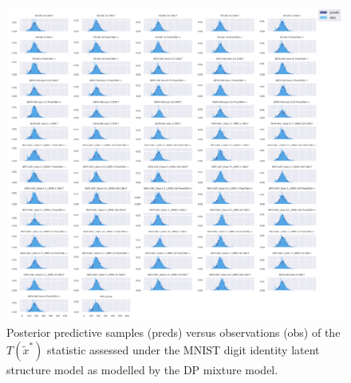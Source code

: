 \begin{figure}[!htb]
    \centering
    \includegraphics[width=\textwidth]{images/bda_checks/surprisal_dps/mnist_prediction_checks__unconditional_conditional.png}
    \caption{Posterior predictive samples (preds) versus observations (obs) of the $T(\tilde x^*)$ statistic assessed under the MNIST digit identity latent structure model as modelled by the DP mixture model.}
    \label{fig:surprisal_check_mnist_uncon_con}
\end{figure}

